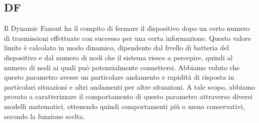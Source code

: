 \subsection{\acf{DF}}
Il Dynamic Fanout ha il compito di fermare il dispositivo dopo un certo numero di trasmissioni effettuate con successo per una certa informazione. Questo valore limite è calcolato in modo dinamico, dipendente dal livello di batteria del dispositivo e dal numero di nodi che il sistema riesce a percepire, quindi al numero di nodi ai quali può potenzialmente connettersi. Abbiamo voluto che questo parametro avesse un particolare andamento e rapidità di risposta in particolari situazioni e altri andamenti per altre situazioni. A tale scopo, abbiamo provato a caratterizzare il comportamento di questo parametro attraverso diversi modelli matematici, ottenendo quindi comportamenti più o meno conservativi, secondo la funzione scelta.

